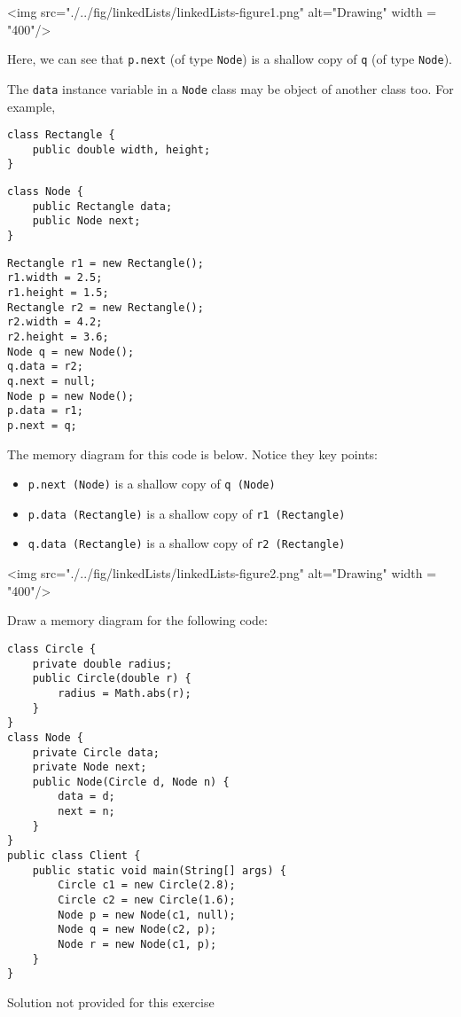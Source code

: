 \begin{center}
<img src="./../fig/linkedLists/linkedLists-figure1.png" alt="Drawing" width = "400"/>
\end{center}

Here, we can see that \texttt{p.next} (of type \texttt{Node}) is a shallow copy of \texttt{q} (of type \texttt{Node}).

The \texttt{data} instance variable in a \texttt{Node} class may be object of another class too. For example,

\begin{lstlisting}
class Rectangle {
	public double width, height;
}  
\end{lstlisting}

\begin{lstlisting}
class Node {
	public Rectangle data;
	public Node next;
}
\end{lstlisting}

\begin{lstlisting}
Rectangle r1 = new Rectangle();
r1.width = 2.5;
r1.height = 1.5;
Rectangle r2 = new Rectangle();
r2.width = 4.2;
r2.height = 3.6;
Node q = new Node();
q.data = r2;
q.next = null;
Node p = new Node();
p.data = r1;
p.next = q;
\end{lstlisting}

The memory diagram for this code is below. Notice they key points:

\begin{itemize}
\item \texttt{p.next (Node)} is a shallow copy of \texttt{q (Node)}
\item \texttt{p.data (Rectangle)} is a shallow copy of \texttt{r1 (Rectangle)}
\item \texttt{q.data (Rectangle)} is a shallow copy of \texttt{r2 (Rectangle)}
\end{itemize}

\begin{center}
<img src="./../fig/linkedLists/linkedLists-figure2.png" alt="Drawing" width = "400"/>
\end{center}

\begin{exercise}[5]
Draw a memory diagram for the following code:

\begin{lstlisting}[basicstyle=\small]
class Circle {
	private double radius;
	public Circle(double r) { 
		radius = Math.abs(r); 
	}
}
class Node {
	private Circle data;
	private Node next;
	public Node(Circle d, Node n) { 
		data = d; 
		next = n; 
	}
}
public class Client {
	public static void main(String[] args) {
		Circle c1 = new Circle(2.8);
		Circle c2 = new Circle(1.6);
		Node p = new Node(c1, null);
		Node q = new Node(c2, p);
		Node r = new Node(c1, p);
	}
}
\end{lstlisting}	
\end{exercise}
\begin{answer}
Solution not provided for this exercise	
\end{answer}

